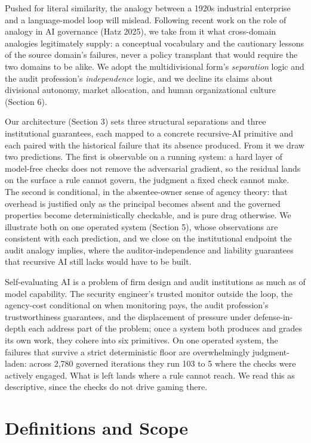 \documentclass[11pt]{article}
\begin{document}
Pushed for literal similarity, the analogy between a 1920s industrial enterprise and a language-model loop will mislead. Following recent work on the role of analogy in AI governance (Hatz 2025), we take from it what cross-domain analogies legitimately supply: a conceptual vocabulary and the cautionary lessons of the source domain's failures, never a policy transplant that would require the two domains to be alike. We adopt the multidivisional form's \emph{separation} logic and the audit profession's \emph{independence} logic, and we decline its claims about divisional autonomy, market allocation, and human organizational culture (Section 6).

Our architecture (Section 3) sets three structural separations and three institutional guarantees, each mapped to a concrete recursive-AI primitive and each paired with the historical failure that its absence produced. From it we draw two predictions. The first is observable on a running system: a hard layer of model-free checks does not remove the adversarial gradient, so the residual lands on the surface a rule cannot govern, the judgment a fixed check cannot make. The second is conditional, in the absentee-owner sense of agency theory: that overhead is justified only as the principal becomes absent and the governed properties become deterministically checkable, and is pure drag otherwise. We illustrate both on one operated system (Section 5), whose observations are consistent with each prediction, and we close on the institutional endpoint the audit analogy implies, where the auditor-independence and liability guarantees that recursive AI still lacks would have to be built.

Self-evaluating AI is a problem of firm design and audit institutions as much as of model capability. The security engineer's trusted monitor outside the loop, the agency-cost conditional on when monitoring pays, the audit profession's trustworthiness guarantees, and the displacement of pressure under defense-in-depth each address part of the problem; once a system both produces and grades its own work, they cohere into six primitives. On one operated system, the failures that survive a strict deterministic floor are overwhelmingly judgment-laden: across 2,780 governed iterations they run 103 to 5 where the checks were actively engaged. What is left lands where a rule cannot reach. We read this as descriptive, since the checks do not drive gaming there.

\section{Definitions and Scope}
\end{document}
